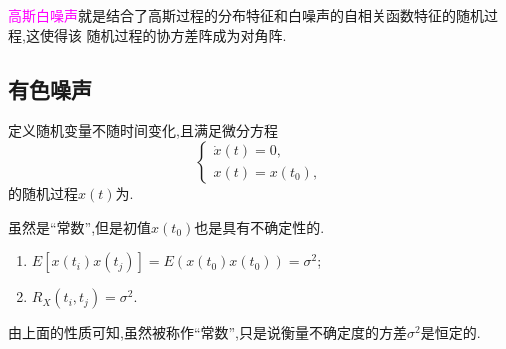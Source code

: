 \documentclass[cn,10pt,citestyle=gb7714-2015,bibstyle=gb7714-2015]{elegantbook}
\begin{document}
\textcolor{magenta}{高斯白噪声}就是结合了高斯过程的分布特征和白噪声的自相关函数特征的随机过程,这使得该
随机过程的协方差阵成为对角阵.
\subsection{有色噪声}
\begin{definition}[随机常数]\label{def:random-constant}
  定义随机变量不随时间变化,且满足微分方程
  \begin{equation}
    \begin{cases}
      \dot{x}(t)=0,\\
      x(t)=x(t_0),
    \end{cases}
  \end{equation}
  的随机过程$x(t)$为.
\end{definition}
\begin{note}
  虽然是“常数”,但是初值$x(t_0)$也是具有不确定性的.
\end{note}
\begin{property}
\begin{enumerate}
  \item $E[x(t_i)x(t_j)]=E(x(t_0)x(t_0))=\sigma^2$;
  \item $R_X(t_i,t_j)=\sigma^2$.
\end{enumerate}
\end{property}
由上面的性质可知,虽然被称作“常数”,只是说衡量不确定度的方差$\sigma^2$是恒定的.
\end{document}
